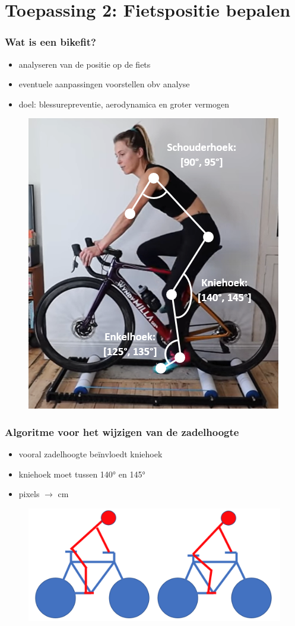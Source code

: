 \documentclass
   [kulak] %
   {kulakbeamer}
\begin{document}
\section{Toepassing 2: Fietspositie bepalen}

\begin{frame}
	\frametitle{Wat is een bikefit?}
	\begin{itemize}
		\item analyseren van de positie op de fiets
		\item eventuele aanpassingen voorstellen obv analyse
		\item doel: blessurepreventie, aerodynamica en groter vermogen
	\end{itemize}
\begin{figure}
	\includegraphics[width= .4\textwidth]{bikefit_hoeken_foto}
\end{figure}
\end{frame}

\begin{frame}
	\frametitle{Algoritme voor het wijzigen van de zadelhoogte}
	\begin{itemize}
		\item vooral zadelhoogte beïnvloedt kniehoek
		\item kniehoek moet tussen 140° en 145°
		\item pixels $\rightarrow$ \si{cm}
	\end{itemize}
	\begin{figure}
		\includegraphics[width= \textwidth]{zadel.png}
	\end{figure}
\end{frame}
\end{document}
